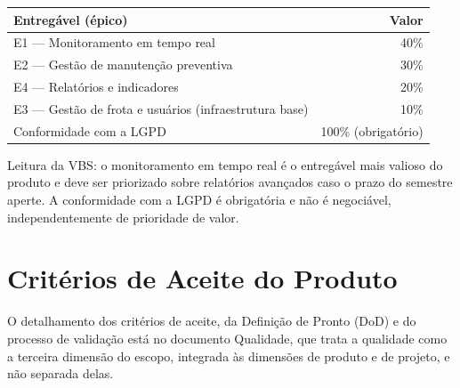 \documentclass[11pt,a4paper]{article}
\begin{document}
\begin{center}
\begin{tabularx}{\textwidth}{L r}
\toprule
\textbf{Entregável (épico)} & \textbf{Valor} \\
\midrule
E1 --- Monitoramento em tempo real & 40\% \\
E2 --- Gestão de manutenção preventiva & 30\% \\
E4 --- Relatórios e indicadores & 20\% \\
E3 --- Gestão de frota e usuários (infraestrutura base) & 10\% \\
Conformidade com a LGPD & 100\% (obrigatório) \\
\bottomrule
\end{tabularx}
\end{center}

\noindent Leitura da VBS: o monitoramento em tempo real é o entregável mais valioso do produto e deve ser priorizado sobre relatórios avançados caso o prazo do semestre aperte. A conformidade com a LGPD é obrigatória e não é negociável, independentemente de prioridade de valor.

\section{Critérios de Aceite do Produto}
O detalhamento dos critérios de aceite, da Definição de Pronto (DoD) e do processo de validação está no documento Qualidade, que trata a qualidade como a terceira dimensão do escopo, integrada às dimensões de produto e de projeto, e não separada delas.
\end{document}

